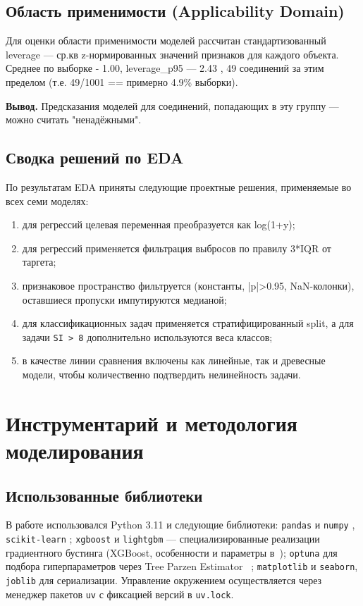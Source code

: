 \documentclass[12pt,a4paper]{report}
\begin{document}
\section{Область применимости (Applicability Domain)}

Для оценки области применимости моделей рассчитан стандартизованный leverage --- ср.кв z-нормированных значений признаков для каждого объекта. Среднее по выборке - 1.00, leverage\_p95 --- 2.43 , 49 соединений за этим пределом (т.е. 49/1001 == примерно 4.9\% выборки).

\textbf{Вывод.} Предсказания моделей для соединений, попадающих в эту группу --- можно считать "ненадёжными".
\section{Сводка решений по EDA}

По результатам EDA приняты следующие проектные решения, применяемые во всех семи моделях:
\begin{enumerate}
    \item для регрессий целевая переменная преобразуется как log(1+y);
    \item для регрессий применяется фильтрация выбросов по правилу 3*IQR от таргета;
    \item признаковое пространство фильтруется (константы, |p|>0.95, NaN-колонки), оставшиеся пропуски импутируются медианой;
    \item для классификационных задач применяется стратифицированный split, а для задачи \texttt{SI > 8} дополнительно используются веса классов;
    \item в качестве линии сравнения включены как линейные, так и древесные модели, чтобы количественно подтвердить нелинейность задачи.
\end{enumerate}

\chapter{Инструментарий и методология моделирования}

\section{Использованные библиотеки}

В работе использовался Python 3.11 и следующие библиотеки: \texttt{pandas} и \texttt{numpy} , \texttt{scikit-learn} ; \texttt{xgboost} и \texttt{lightgbm} --- специализированные реализации градиентного бустинга (XGBoost, особенности и параметры в~\cite{habr-xgboost}); \texttt{optuna} для подбора гиперпараметров через Tree Parzen Estimator ~\cite{habr-optuna}; \texttt{matplotlib} и \texttt{seaborn}, \texttt{joblib} для сериализации. Управление окружением осуществляется через менеджер пакетов \texttt{uv} с фиксацией версий в \texttt{uv.lock}.
\end{document}
